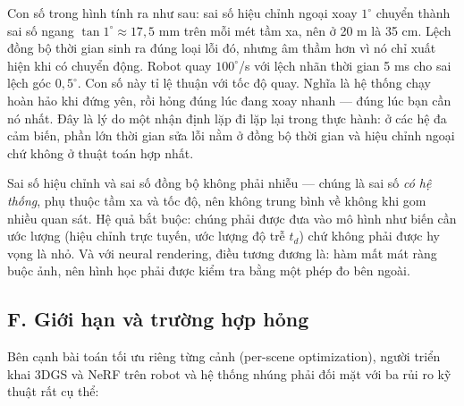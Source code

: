 \documentclass[../../../deep_learning.tex]{subfiles}
\begin{document}
Con số trong hình tính ra như sau: sai số hiệu chỉnh ngoại xoay \(1^{\circ}\) chuyển thành sai số ngang \(\tan 1^{\circ} \approx 17{,}5\) mm trên mỗi mét tầm xa, nên ở 20 m là 35 cm. Lệch đồng bộ thời gian sinh ra đúng loại lỗi đó, nhưng âm thầm hơn vì nó chỉ xuất hiện khi có chuyển động. Robot quay \(100^{\circ}\)/s với lệch nhãn thời gian 5 ms cho sai lệch góc \(0{,}5^{\circ}\). Con số này tỉ lệ thuận với tốc độ quay. Nghĩa là hệ thống chạy hoàn hảo khi đứng yên, rồi hỏng đúng lúc đang xoay nhanh --- đúng lúc bạn cần nó nhất. Đây là lý do một nhận định lặp đi lặp lại trong thực hành: ở các hệ đa cảm biến, phần lớn thời gian sửa lỗi nằm ở đồng bộ thời gian và hiệu chỉnh ngoại chứ không ở thuật toán hợp nhất.

\begin{cannho}
Sai số hiệu chỉnh và sai số đồng bộ không phải nhiễu --- chúng là sai số \emph{có hệ thống}, phụ thuộc tầm xa và tốc độ, nên không trung bình về không khi gom nhiều quan sát. Hệ quả bắt buộc: chúng phải được đưa vào mô hình như biến cần ước lượng (hiệu chỉnh trực tuyến, ước lượng độ trễ \(t_d\)) chứ không phải được hy vọng là nhỏ. Và với neural rendering, điều tương đương là: hàm mất mát ràng buộc ảnh, nên hình học phải được kiểm tra bằng một phép đo bên ngoài. 
\end{cannho}

\subsection{F. Giới hạn và trường hợp hỏng}
Bên cạnh bài toán tối ưu riêng từng cảnh (per-scene optimization), người triển khai 3DGS và NeRF trên robot và hệ thống nhúng phải đối mặt với ba rủi ro kỹ thuật rất cụ thể:
\end{document}

